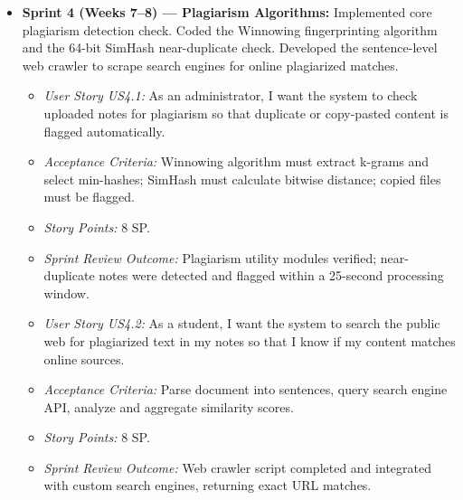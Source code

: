 \documentclass[12,Times new Roman,a4paper]{report}
\begin{document}
\begin{itemize}
    \item \textbf{Sprint 4 (Weeks 7--8) --- Plagiarism Algorithms:} Implemented core plagiarism detection check. Coded the Winnowing fingerprinting algorithm and the 64-bit SimHash near-duplicate check. Developed the sentence-level web crawler to scrape search engines for online plagiarized matches.
    \begin{itemize}
        \item \textit{User Story US4.1:} As an administrator, I want the system to check uploaded notes for plagiarism so that duplicate or copy-pasted content is flagged automatically.
        \item \textit{Acceptance Criteria:} Winnowing algorithm must extract k-grams and select min-hashes; SimHash must calculate bitwise distance; copied files must be flagged.
        \item \textit{Story Points:} 8 SP.
        \item \textit{Sprint Review Outcome:} Plagiarism utility modules verified; near-duplicate notes were detected and flagged within a 25-second processing window.
    \end{itemize}
    \begin{itemize}
        \item \textit{User Story US4.2:} As a student, I want the system to search the public web for plagiarized text in my notes so that I know if my content matches online sources.
        \item \textit{Acceptance Criteria:} Parse document into sentences, query search engine API, analyze and aggregate similarity scores.
        \item \textit{Story Points:} 8 SP.
        \item \textit{Sprint Review Outcome:} Web crawler script completed and integrated with custom search engines, returning exact URL matches.
    \end{itemize}
    

\end{itemize}
\end{document}
